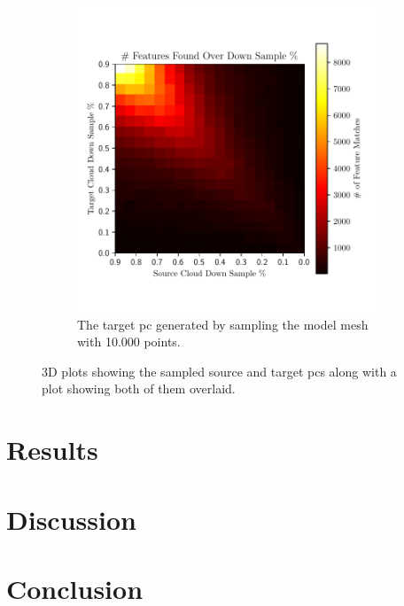 \begin{figure}[!h]
\begin{subfigure}[b]{0.48\textwidth}
		\includegraphics[width=\textwidth]{chapters/2-pose-estimation/fig/M_unfiltered.pdf}
		\caption{The target \gls{pc} generated by sampling the model mesh with \num{10,000} points.}
		\label{fig:pe-feature-unfiltered-pc}
	\end{subfigure}
	\caption{3D plots showing the sampled source and target \gls{pc}s along with a plot showing both of them overlaid.}
	\label{fig:pe-filture-and-unfiltered-pc}
\end{figure}



\section{Results}\label{sec:2-pose-estimation-results}


\section{Discussion}\label{sec:2-pose-estimation-discussion}

\section{Conclusion}\label{sec:2-pose-estimation-conclusion}